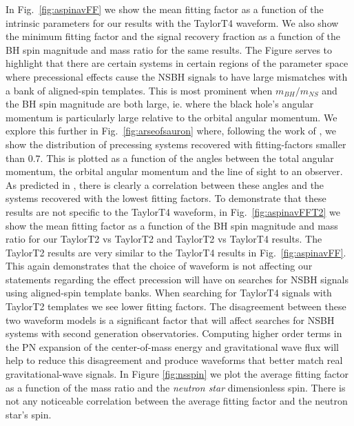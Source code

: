 In Fig.~\ref{fig:aspinavFF} we show the mean fitting factor as a function of
the intrinsic parameters
for our results with the TaylorT4 waveform. We also show the minimum fitting
factor and the signal recovery
fraction as a function of the \ac{BH} spin magnitude
and mass ratio for the same results.
The Figure serves to highlight that there are certain
systems in certain regions of the parameter space where precessional effects
cause the \ac{NSBH} signals to have large mismatches with a bank of
aligned-spin templates. This is most prominent when $m_{BH} / m_{NS}$ and the
\ac{BH} spin magnitude are both large, ie. where the black 
hole's angular momentum is particularly large relative to the orbital angular 
momentum. 
We explore this further in Fig.~\ref{fig:arseofsauron} where, following the
work of \cite{Brown:2012gs}, we show the distribution
of precessing systems recovered with fitting-factors smaller than $0.7$. This
is plotted as a function of the angles between the total angular 
momentum, the orbital angular momentum and the line of sight to an observer. 
As predicted in \cite{Brown:2012gs}, there is clearly a correlation
between these angles and the systems recovered with the lowest fitting factors.
To demonstrate that these results are not specific to the TaylorT4 waveform, in
Fig.~\ref{fig:aspinavFFT2} we show the mean fitting factor as a function of
the \ac{BH} spin magnitude and mass ratio for our TaylorT2 vs TaylorT2 and
TaylorT2 vs TaylorT4 results. The TaylorT2 results are very similar to the
TaylorT4 results in Fig.~\ref{fig:aspinavFF}. This again demonstrates that the
choice of waveform is not affecting our statements regarding the effect
precession will have on searches for \ac{NSBH} signals using aligned-spin
template banks. When searching for TaylorT4 signals with TaylorT2 templates
we see lower fitting factors. The disagreement between these two waveform models
is a significant factor that will affect searches for \ac{NSBH} systems with
second generation observatories. Computing higher order terms in the \acf{PN}
expansion of the center-of-mass energy and gravitational wave flux will help to
reduce this disagreement and produce waveforms that better match real
gravitational-wave signals. In Figure \ref{fig:nsspin} we plot the average 
fitting factor as a function of the mass ratio and the \emph{neutron star} 
dimensionless spin. There is not any noticeable correlation between the average 
fitting factor and the neutron star's spin.

